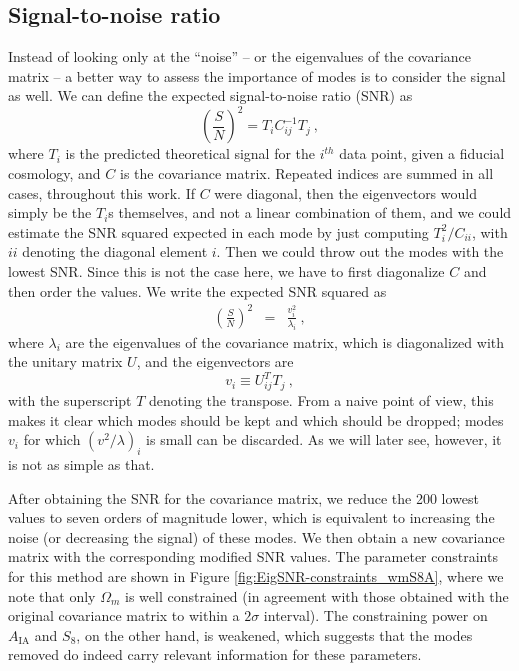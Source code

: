 \documentclass[twocolumn,nofootinbib]{\docclass}
\newcommand{\rf}[1]{Figure \ref{fig:#1}}
\newcommand\be{\begin{equation}}
\newcommand\ee{\end{equation}}
\newcommand\bea{\begin{eqnarray}}
\newcommand\eea{\end{eqnarray}}
\begin{document}
\subsection{Signal-to-noise ratio}
\label{subsec:snr}

Instead of looking only at the ``noise'' -- or the eigenvalues of the covariance matrix -- a better way to assess the importance of modes is to consider the signal as well. We can define the expected signal-to-noise ratio (SNR) as
\be
\left(\frac{S}{N}\right)^2 = T_i C^{-1}_{ij} T_j\
,\ee
where $T_i$ is the predicted theoretical signal for the $i^{th}$ data point, given a fiducial cosmology, and $C$ is the covariance matrix. Repeated indices are summed in all cases, throughout this work. If $C$ were diagonal, then the eigenvectors would simply be the $T_i$s themselves, and not a linear combination of them, and we could estimate the SNR squared expected in each mode by just computing $T_i^2/C_{ii}$, with $ii$ denoting the diagonal element $i$. Then we could throw out the modes with the lowest SNR. Since this is not the case here, we have to first diagonalize $C$ and then order the values. We write the expected SNR squared as
\bea
\left(\frac{S}{N}\right)^2
&=& \frac{v_i^2}{\lambda_i}\
,\eea
where $\lambda_i$ are the eigenvalues of the covariance matrix, which is diagonalized with the unitary matrix $U$, and the eigenvectors are 
\be
v_i\equiv U_{ij}^T T_j\
,\ee
with the superscript $T$ denoting the transpose. From a naive point of view, this makes it clear which modes should be kept and which should be dropped; modes $v_i$ for which $\left(v^2/\lambda\right)_i$ is small can be discarded. As we will later see, however, it is not as simple as that.

After obtaining the SNR for the covariance matrix, we reduce the 200 lowest values to seven orders of magnitude lower, which is equivalent to increasing the noise (or decreasing the signal) of these modes. We then obtain a new covariance matrix with the corresponding modified SNR values. The parameter constraints for this method are shown in \rf{EigSNR-constraints_wmS8A}, where we note that only $\Omega_m$ is well constrained (in agreement with those obtained with the original covariance matrix to within a $2\sigma$ interval). The constraining power on $A_{\text{IA}}$ and $S_8$, on the other hand, is weakened, which suggests that the modes removed do indeed carry relevant information for these parameters.
\end{document}
